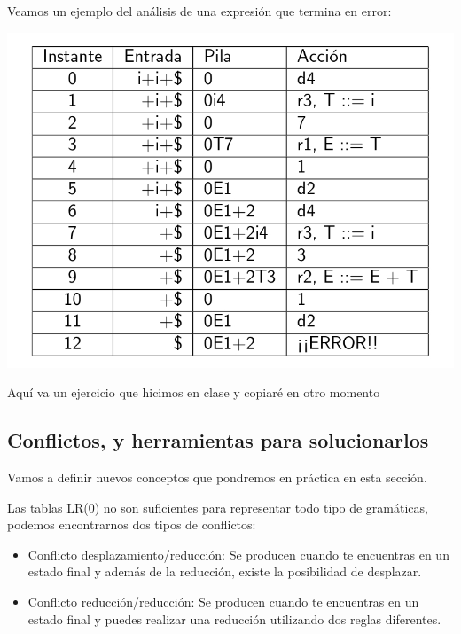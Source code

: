 \documentclass{apuntes}
\begin{document}
\begin{example}
Veamos un ejemplo del análisis de una expresión que termina en error:

\begin{center}
\includegraphics[scale=0.3]{img/tablaanallr0error.jpg}
\end{center}
\end{example}


\begin{example}
Aquí va un ejercicio que hicimos en clase y copiaré en otro momento
\end{example}

\subsection{Conflictos, y herramientas para solucionarlos}
Vamos a definir nuevos conceptos que pondremos en práctica en esta sección.

Las tablas LR(0) no son suficientes para representar todo tipo de gramáticas, podemos encontrarnos dos tipos de conflictos:

\begin{itemize}
\item Conflicto desplazamiento/reducción: Se producen cuando te encuentras en un estado final y además de la reducción, existe la posibilidad de desplazar.
\item Conflicto reducción/reducción: Se producen cuando te encuentras en un estado final y puedes realizar una reducción utilizando dos reglas diferentes.
\end{itemize}
\end{document}
